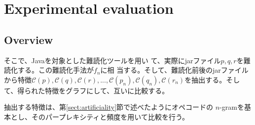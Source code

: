 \documentclass[conference]{IEEEtran}
\newcommand{\birth}[1]{\mathcal{C}(#1)}
\begin{document}

%
%
%
%
%
%
%
%


\section{Experimental evaluation}
\subsection{Overview}


そこで、Javaを対象とした難読化ツールを用い
て、実際にjarファイル$p, q, r$を難読化する。この難読化手法が$f_n$に相
当する。そして、難読化前後のjarファイルから特徴$\birth{p}, \birth{q},
\birth{r}, ..., \birth{p_n}, \birth{q_n}, \birth{r_n}$を抽出する。そし
て、得られた特徴をグラフにして、互いに比較する。

抽出する特徴は、第\ref{sect:artificiality}節で述べたようにオペコードの
$n$-gramを基本とし、そのパープレキシティと頻度を用いて比較を行う。
\end{document}
